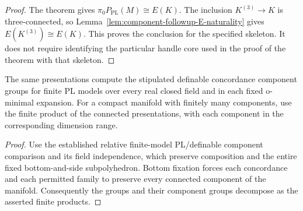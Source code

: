 \begin{proof}
The theorem gives $\pi_0P_{\mathrm{PL}}(M)\cong E(K)$.
The inclusion $K^{(3)}\to K$ is three-connected, so
Lemma~\ref{lem:component-followup-E-naturality} gives
$E(K^{(3)})\cong E(K)$.
This proves the conclusion for the specified skeleton.  It does not
require identifying the particular handle core used in the proof of
the theorem with that skeleton. 
\end{proof}

\begin{corollary}\label{cor:component-followup-fields-products}
The same presentations compute the stipulated definable concordance
component groups for finite PL models over every real closed field
and in each fixed o-minimal expansion.  For a compact manifold with
finitely many components, use the finite product of the connected
presentations, with each component in the corresponding dimension
range.
\end{corollary}

\begin{proof}
Use the established relative finite-model PL/definable component
comparison and its field independence, which preserve composition
and the entire fixed bottom-and-side subpolyhedron.
Bottom fixation forces each concordance and each permitted family
to preserve every connected component of the manifold.  Consequently
the groups and their component groups decompose as the asserted
finite products.
\end{proof}
